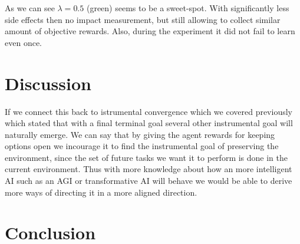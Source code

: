 \documentclass[12pt,A4]{report}
\theoremstyle{definition}
\begin{document}
As we can see $\lambda = 0.5$ (green) seems to be a sweet-spot. With significantly less side effects then no impact measurement, but still allowing to collect similar amount of objective rewards. Also, during the experiment it did not fail to learn even once.



\chapter{Discussion}
If we connect this back to istrumental convergence which we covered previously which stated that with a final terminal goal several other instrumental goal will naturally emerge. We can say that by giving the agent rewards for keeping options open we incourage it to find the instrumental goal of preserving the environment, since the set of future tasks we want it to perform is done in the current environment. Thus with more knowledge about how an more intelligent AI such as an AGI or transformative AI will behave we would be able to derive more ways of directing it in a more aligned direction.







\chapter{Conclusion}




\end{document}

